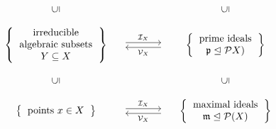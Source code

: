 \begin{theorem}
\begin{enumerate}
\[\begin{matrix}
          \\
            {}
          & {}
          & {}
          \\
            \rotatebox[origin=c]{90}{$\subseteq$}
          & {}
          & \rotatebox[origin=c]{90}{$\subseteq$}
          \\
            {}
          & {}
          & {}
          \\
            \left\{
              \begin{tabular}{c}
                  irreducible \\
                  algebraic subsets \\
                  $Y \subseteq X$
              \end{tabular}
            \right\}
          & \begin{tikzcd}[column sep = large]
                {}
                \arrow[shift left]{r}{\mc{I}_X}
              & {}
                \arrow[shift left]{l}{\mc{V}_X}
            \end{tikzcd}
          & \left\{
              \begin{tabular}{c}
                prime ideals \\
                $\mf{p} \idealleq \mc{P}X)$
              \end{tabular}
            \right\}
          \\
            {}
          & {}
          & {}
          \\
            \rotatebox[origin=c]{90}{$\subseteq$}
          & {}
          & \rotatebox[origin=c]{90}{$\subseteq$}
          \\
            {}
          & {}
          & {}
          \\
            \left\{
              \begin{tabular}{c}
                points $x \in X$
              \end{tabular}
            \right\}
          & \begin{tikzcd}[column sep = large]
                {}
                \arrow[shift left]{r}{\mc{I}_X}
              & {}
                \arrow[shift left]{l}{\mc{V}_X}
            \end{tikzcd}
          & \left\{
              \begin{tabular}{c}
                maximal ideals \\
                $\mf{m} \idealleq \mc{P}(X)$
              \end{tabular}
            \right\}
        \end{matrix}
      \]
  \end{enumerate}
\end{theorem}








